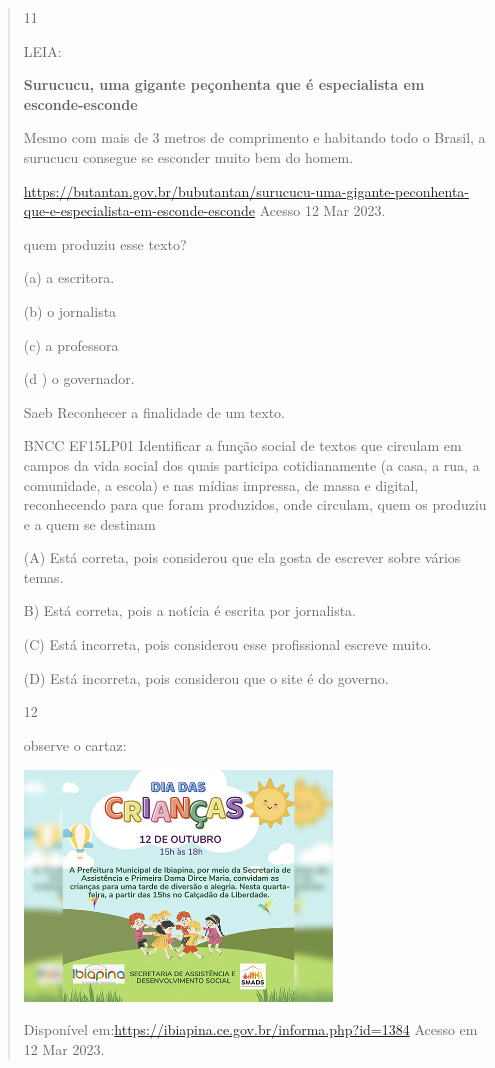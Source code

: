 \begin{verse}
{{{{{\num{11}

LEIA:

\textbf{Surucucu, uma gigante peçonhenta que é especialista em
esconde-esconde}

Mesmo com mais de 3 metros de comprimento e habitando todo o Brasil, a
surucucu consegue se esconder muito bem do homem.

\url{https://butantan.gov.br/bubutantan/surucucu-uma-gigante-peconhenta-que-e-especialista-em-esconde-esconde}
Acesso 12 Mar 2023.

quem produziu esse texto?

(a) a escritora.

(b) o jornalista

(c) a professora

(d ) o governador.

Saeb Reconhecer a finalidade de um texto.

BNCC EF15LP01 Identificar a função social de textos que circulam em
campos da vida social dos quais participa cotidianamente (a casa, a rua,
a comunidade, a escola) e nas mídias impressa, de massa e digital,
reconhecendo para que foram produzidos, onde circulam, quem os produziu
e a quem se destinam

(A) Está correta, pois considerou que ela gosta de escrever sobre vários
temas.

B) Está correta, pois a notícia é escrita por jornalista.

(C) Está incorreta, pois considerou esse profissional escreve muito.

(D) Está incorreta, pois considerou que o site é do governo.

\num{12}

observe o cartaz:

\includegraphics[width=3.22436in,height=2.42060in]{media/image181.jpeg}

Disponível em:\url{https://ibiapina.ce.gov.br/informa.php?id=1384}
Acesso em 12 Mar 2023.

}}}}}
\end{verse}
